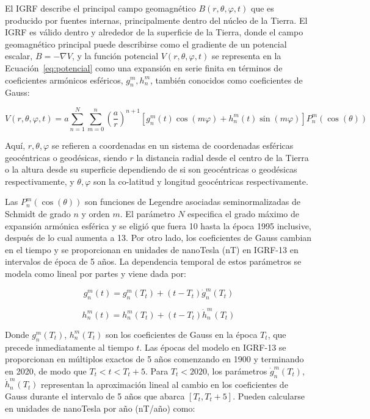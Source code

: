El IGRF describe el principal campo geomagnético $B(r, \theta, \varphi, t)$ que es producido por fuentes internas, principalmente dentro del núcleo de la Tierra. El IGRF es válido dentro y alrededor de la superficie de la Tierra, donde el campo geomagnético principal puede describirse como el gradiente de un potencial escalar, $B = -\nabla V$, y la función potencial $V(r, \theta, \varphi, t)$ se representa en la Ecuación~\ref{eq:potencial} como una expansión en serie finita en términos de coeficientes armónicos esféricos, $g_n^m, h_n^m$, también conocidos como coeficientes de Gauss:

\begin{equation}
	V(r, \theta, \varphi, t) = a \sum_{n=1}^{N} \sum_{m=0}^{n} \left( \frac{a}{r} \right)^{n+1} 
	\left[ g_n^m(t) \cos(m \varphi) + h_n^m(t) \sin(m \varphi) \right] P_n^m(\cos(\theta))
	\label{eq:potencial}
\end{equation}

Aquí, $r, \theta, \varphi$ se refieren a coordenadas en un sistema de coordenadas esféricas geocéntricas o geodésicas, siendo $r$ la distancia radial desde el centro de la Tierra o la altura desde su superficie dependiendo de si son geocéntricas o geodésicas respectivamente, y $\theta, \varphi$ son la co-latitud y longitud geocéntricas respectivamente. 

Las $P_n^m (\cos(\theta))$ son funciones de Legendre asociadas seminormalizadas de Schmidt de grado $n$ y orden $m$. El parámetro $N$ especifica el grado máximo de expansión armónica esférica y se eligió que fuera 10 hasta la época 1995 inclusive, después de lo cual aumenta a 13. Por otro lado, los coeficientes de Gauss cambian en el tiempo y se proporcionan en unidades de nanoTesla (nT) en IGRF-13 en intervalos de época de 5 años. La dependencia temporal de estos parámetros se modela como lineal por partes y viene dada por:

\begin{equation}
	g_n^m (t) = g_n^m (T_t) + (t - T_t) \dot{g}_n^m (T_t)
\end{equation}

\begin{equation}
	h_n^m (t) = h_n^m (T_t) + (t - T_t) \dot{h}_n^m (T_t)
\end{equation}

Donde $g_n^m (T_t)$, $h_n^m (T_t)$ son los coeficientes de Gauss en la época $T_t$, que precede inmediatamente al tiempo $t$. Las épocas del modelo en IGRF-13 se proporcionan en múltiplos exactos de 5 años comenzando en 1900 y terminando en 2020, de modo que $T_t < t < T_t+5$. Para $T_t < 2020$, los parámetros $\dot{g}_n^m (T_t)$, $\dot{h}_n^m (T_t)$ representan la aproximación lineal al cambio en los coeficientes de Gauss durante el intervalo de 5 años que abarca $[T_t, T_t+5]$. Pueden calcularse en unidades de nanoTesla por año (nT/año) como:


